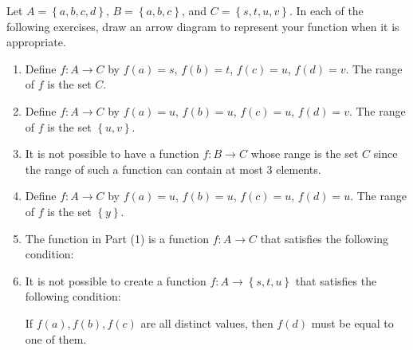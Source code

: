 \documentclass[11pt]{article}
\begin{document}
\noindent
Let  $A = \left\{ {a, b, c, d} \right\}$, $B = \left\{ {a, b, c} \right\}$, and  
$C = \left\{ {s, t, u, v} \right\}$.  In each of the following exercises, draw an arrow diagram to represent your function when it is appropriate.

\begin{enumerate}
\item Define  $f:A \to C$  by  $f( a ) = s$, $f( b ) = t$, 
$f( c ) = u$, $f( d ) = v$.  The range of  $f$  is the set  $C$. 

\item Define  $f:A \to C$  by  $f( a ) = u$, $f( b ) = u$, 
$f( c ) = u$, $f( d ) = v$.  The range of  $f$  is the set   
$\left\{ {u, v} \right\}$.

\item It is not possible to have a function  $f:B \to C$ whose range is the set   $C$  since the range of such a function can contain at most 3 elements.

\item Define  $f:A \to C$  by  $f( a ) = u$, $f( b ) = u$, 
$f( c ) = u$, $f( d ) = u$.  The range of  $f$  is the set   
$\left\{ y \right\}$.

\item The function in Part (1) is a function  $f:A \to C$  that satisfies the following condition:


\item It is not possible to create a function  $f:A \to \left\{ {s, t, u} \right\}$ that satisfies the following condition:


If  $f( a ), f( b ), f( c )$ are all distinct values, then  
$f( d )$ must be equal to one of them.
\end{enumerate}
\end{document}
